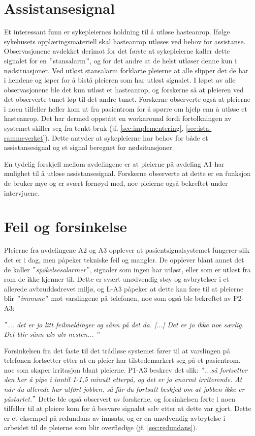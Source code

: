 \section{Assistansesignal}
Et interessant funn er sykepleiernes holdning til å utløse hasteanrop. Ifølge sykehusets opplæringsmateriell skal hasteanrop utløses ved behov for assistanse. Observasjonene avdekket derimot for det første at sykepleierne kaller dette signalet for en $"$stansalarm$"$, og for det andre at de helst utløser denne kun i nødsituasjoner. Ved utløst stansalarm forklarte pleierne at alle slipper det de har i hendene og løper for å bistå pleieren som har utløst signalet. I løpet av alle observasjonene ble det kun utløst et hasteanrop, og forskerne så at pleieren ved det observerte tunet løp til det andre tunet. Forskerne observerte også at pleierne i noen tilfeller heller kom ut fra pasientrom for å spørre om hjelp enn å utløse et hasteanrop. Det har dermed oppstått en workaround fordi fortolkningen av systemet skiller seg fra tenkt bruk (jf. \ref{sec:implementering}, \ref{sec:ista-rammeverket}). Dette antyder at sykepleierne har behov for både et assistansesignal og et signal beregnet for nødsituasjoner.

\noindent
En tydelig forskjell mellom avdelingene er at pleierne på avdeling A1 har mulighet til å utløse assistansesignal. Forskerne observerte at dette er en funksjon de bruker mye og er svært fornøyd med, noe pleierne også bekreftet under intervjuene. 

\section{Feil og forsinkelse}
Pleierne fra avdelingene A2 og A3 opplever at pasientsignalsystemet fungerer slik det er i dag, men påpeker tekniske feil og mangler. De opplever blant annet det de kaller \textit{$"$spøkelsesalarmer$"$}, signaler som ingen har utløst, eller som er utløst fra rom de ikke kjenner til. Dette er svært unødvendig støy og avbrytelser i et allerede avbruddsdrevet miljø, og L-A3 påpeker at dette kan føre til at pleierne blir \textit{$"$immune$"$} mot varslingene på telefonen, noe som også ble bekreftet av P2-A3:

\noindent
\textit{$"$... det er jo litt feilmeldinger og sånn på det da. [...] Det er jo ikke noe særlig. Det blir sånn ulv ulv nesten... $"$}

\noindent 
Forsinkelsen fra det faste til det trådløse systemet fører til at varslingen på telefonen fortsetter etter at en pleier har tilstedemarkert seg på et pasientrom, noe som skaper irritasjon blant pleierne. P1-A3 beskrev det slik: \textit{$"$...så fortsetter den her å pipe i inntil 1-1,5 minutt etterpå, og det er jo enormt irriterende. At når du allerede har utført jobben, så får du fortsatt beskjed om at jobben ikke er påstartet.$"$} Dette ble også observert av forskerne, og forsinkelsen førte i noen tilfeller til at pleiere kom for å besvare signalet selv etter at dette var gjort. Dette er et eksempel på redundans av innsats, og er en unødvendig avbrytelse i arbeidet til de pleierne som blir overflødige (jf. \ref {sec:redundans}).

